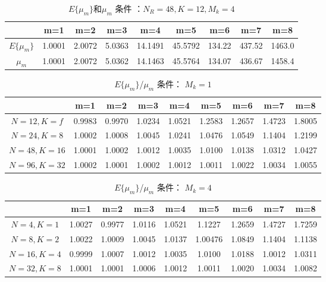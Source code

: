 \documentclass[bachelor,nocolorlinks, printoneside]{seuthesis} %
\begin{document}
\begin{Main}
\begin{table}[htbp]
	\centering
	\caption{\label{tab:Emu1} $E\lbrace\mu_m\rbrace$和$\mu_m$ 条件 ：$N_R =48,K=12,M_k=4$}
	\begin{tabular}{|c|c|c|c|c|c|c|c|c|}
		\hline
		\quad &  m=1 &  m=2 &  m=3 &  m=4 &  m=5 &  m=6 &  m=7 &  m=8  \\
		\hline
		$E\lbrace\mu_m\rbrace$ &  1.0001 & 2.0072 & 5.0363 & 14.1491 & 45.5792 &134.22 &437.52 &1463.0 \\
		\hline
		$\mu_m$ &  1.0001 & 2.0072 & 5.0362 & 14.1463 & 45.5764 &134.07 &436.67 &1458.4 \\
		\hline
	\end{tabular}
\end{table}

\begin{table}[htbp]
	\centering
	\caption{\label{tab:Emu2} $E\lbrace\mu_m\rbrace$/$\mu_m$ 条件： $M_k=1$}
	\begin{tabular}{|c|c|c|c|c|c|c|c|c|}
		\hline
		\quad &  m=1 &  m=2 &  m=3 &  m=4 &  m=5 &  m=6 &  m=7 &  m=8  \\
		\hline
		$N=12,K=f$ &  0.9983 & 0.9970 & 1.0234 & 1.0521 & 1.2583 & 1.2657 & 1.4723 &1.8005 \\
		\hline
		$N=24,K=8$ &  1.0002 & 1.0008 & 1.0045 & 1.0241 & 1.0476 & 1.0549 & 1.1404 &1.2199 \\
		\hline
		$N=48,K=16$ &  1.0001 & 1.0002 & 1.0012 & 1.0035 & 1.0100 & 1.0138 & 1.0312 &1.0427 \\
		\hline
		$N=96,K=32$ &  1.0002 & 1.0001 & 1.0002 & 1.0012 & 1.0011 & 1.0022 & 1.0034 &1.0055 \\
		\hline
	\end{tabular}
\end{table}

\begin{table}[htbp]
	\centering
	\caption{\label{tab:Emu3} $E\lbrace\mu_m\rbrace$/$\mu_m$ 条件： $M_k=4$}
	\begin{tabular}{|c|c|c|c|c|c|c|c|c|}
		\hline
		\quad &  m=1 &  m=2 &  m=3 &  m=4 &  m=5 &  m=6 &  m=7 &  m=8  \\
		\hline
		$N=4,K=1$ &  1.0027 & 0.9977 & 1.0116 & 1.0521 & 1.1227 & 1.2659 & 1.4727 &1.7259 \\
		\hline
		$N=8,K=2$ &  1.0022 & 1.0009 & 1.0045 & 1.0137 & 1.00476 & 1.0849 & 1.1404 &1.1138 \\
		\hline
		$N=16,K=4$ &  0.9999 & 1.0007 & 1.0012 & 1.0035 & 1.0100 & 1.0188 & 1.0012 &1.0311 \\
		\hline
		$N=32,K=8$ &  1.0001 & 1.0001 & 1.0006 & 1.0012 & 1.0011 & 1.0020 & 1.0034 &1.0082 \\
		\hline
	\end{tabular}
\end{table}


\end{Main}
\end{document}
